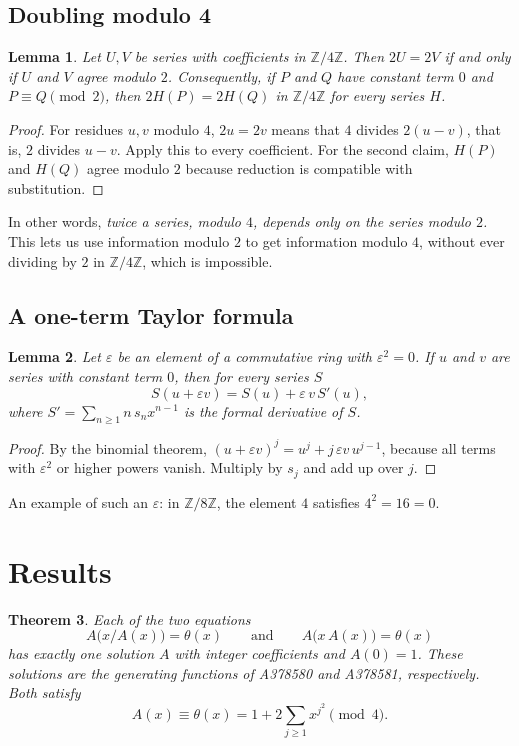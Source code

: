 \documentclass[11pt,a4paper]{article}
\newtheorem{theorem}{Theorem}[section]
\newtheorem{lemma}[theorem]{Lemma}
\theoremstyle{definition}
\theoremstyle{remark}
\newcommand{\Z}{\mathbb{Z}}
\begin{document}
\subsection{Doubling modulo 4}
\begin{lemma}\label{lem:double}
Let $U,V$ be series with coefficients in $\Z/4\Z$. Then $2U=2V$ if and only if $U$ and $V$ agree modulo $2$.
Consequently, if $P$ and $Q$ have constant term $0$ and $P\equiv Q\pmod 2$, then $2H(P)=2H(Q)$ in $\Z/4\Z$ for every
series $H$.
\end{lemma}

\begin{proof}
For residues $u,v$ modulo $4$, $2u=2v$ means that $4$ divides $2(u-v)$, that is, $2$ divides $u-v$. Apply this to
every coefficient. For the second claim, $H(P)$ and $H(Q)$ agree modulo $2$ because reduction is compatible with
substitution.
\end{proof}
In other words, \emph{twice a series, modulo $4$, depends only on the series modulo $2$.} This lets us use information modulo
$2$ to get information modulo $4$, without ever dividing by $2$ in $\Z/4\Z$, which is impossible.

\subsection{A one-term Taylor formula}
\begin{lemma}\label{lem:taylor}
Let $\varepsilon$ be an element of a commutative ring with $\varepsilon^2=0$. If $u$ and $v$ are series with constant
term $0$, then for every series $S$
\[
S(u+\varepsilon v)=S(u)+\varepsilon\,v\,S'(u),
\]
where $S'=\sum_{n\ge1}n\,s_nx^{n-1}$ is the formal derivative of $S$.
\end{lemma}

\begin{proof}
By the binomial theorem, $(u+\varepsilon v)^j=u^j+j\,\varepsilon v\,u^{j-1}$, because all terms with
$\varepsilon^2$ or higher powers vanish. Multiply by $s_j$ and add up over $j$.
\end{proof}
An example of such an $\varepsilon$: in $\Z/8\Z$, the element $4$ satisfies $4^2=16=0$.

\section{Results}\label{sec:results}

\begin{theorem}\label{thm:main}
Each of the two equations
\[
A\bigl(x/A(x)\bigr)=\theta(x)\qquad\text{and}\qquad A\bigl(x\,A(x)\bigr)=\theta(x)
\]
has exactly one solution $A$ with integer coefficients and $A(0)=1$. These solutions are the generating functions of
A378580 and A378581, respectively. Both satisfy
\[
A(x)\equiv\theta(x)=1+2\sum_{j\ge1}x^{j^2}\pmod 4 .
\]
\end{theorem}
\end{document}
